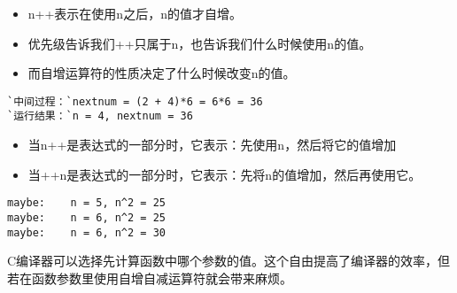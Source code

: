\begin{frame}[fragile]
\begin{itemize}
\item \tf n++表示在使用n之后，n的值才自增。\\[0.1in]
\item 优先级告诉我们++只属于n，也告诉我们什么时候使用n的值。\\[0.1in]
\item 而自增运算符的性质决定了什么时候改变n的值。
\end{itemize}
\end{frame}

\begin{frame}[fragile]

\end{frame}

\begin{frame}[fragile]
\begin{lstlisting}[backgroundcolor=\color{red!10}]
`中间过程：`nextnum = (2 + 4)*6 = 6*6 = 36 
`运行结果：`n = 4, nextnum = 36
\end{lstlisting}
\end{frame}

\begin{frame}[fragile]
\begin{itemize}
\item \tf 当n++是表达式的一部分时，它表示：\textcolor{acolor1}{先使用n，然后将它的值增加}\\[0.1in]
\item 当++n是表达式的一部分时，它表示：\textcolor{acolor1}{先将n的值增加，然后再使用它}。
\end{itemize}
\end{frame}

\begin{frame}[fragile]
  
\end{frame}

\begin{frame}[fragile]
\begin{lstlisting}[backgroundcolor=\color{red!10}]
maybe:    n = 5, n^2 = 25
maybe:    n = 6, n^2 = 25
maybe:    n = 6, n^2 = 30
\end{lstlisting}
\end{frame}

\begin{frame}[fragile]
\tf C编译器可以选择先计算函数中哪个参数的值。这个自由提高了编译器的效率，但若在函数参数里使用自增自减运算符就会带来麻烦。
\end{frame}

